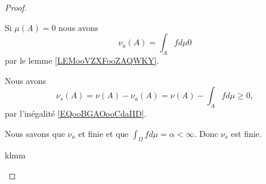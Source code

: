 \begin{proof}
\begin{subproof}
																											Si \( \mu(A)=0\) nous avons
																											\begin{equation}
																											\nu_a(A)=\int_Afd\mu0
																											\end{equation}
																											par le lemme \ref{LEMooVZXFooZAQWKY}.


																											Nous avons
																											\begin{equation}
																											\nu_s(A)=\nu(A)-\nu_a(A)=\nu(A)-\int_Afd\mu\geq 0,
																											\end{equation}
																											par l'inégalité \eqref{EQooBGAOooCdaIID}.


																											Nous savons que \( \nu_a\) et finie et que \( \int_{\Omega}fd\mu=\alpha<\infty\). Donc \( \nu_s\) est finie.

																											\spitem[\( \nu_s\perp\mu\)]
																											klmm

																											\end{subproof}
																											\end{proof}

